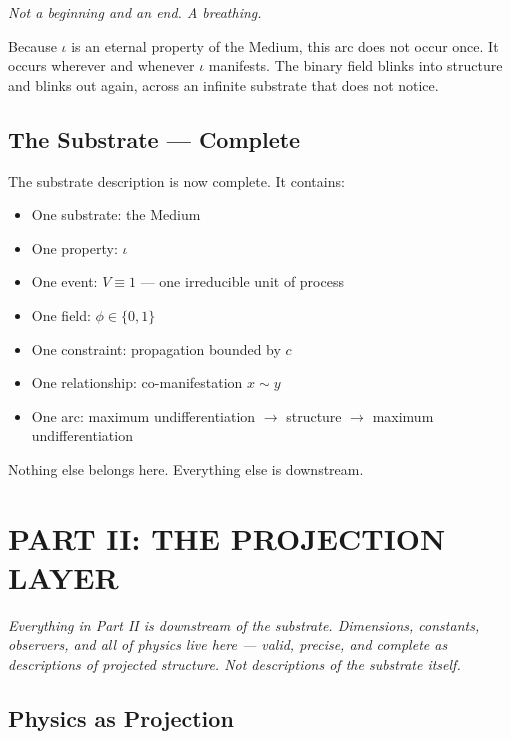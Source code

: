 \documentclass[12pt, letterpaper]{article}
\begin{document}
\begin{center}
\emph{Not a beginning and an end. A breathing.}
\end{center}

Because \(\iota\) is an eternal property of the Medium, this arc does not occur
once. It occurs wherever and whenever \(\iota\) manifests. The binary field
blinks into structure and blinks out again, across an infinite substrate that
does not notice.
\subsection{The Substrate --- Complete}
\label{sec:org5f22ec6}

The substrate description is now complete. It contains:

\begin{substratebox}
\begin{itemize}
\item One substrate: the Medium
\item One property: $\iota$
\item One event: $V \equiv 1$ --- one irreducible unit of process
\item One field: $\phi \in \{0,1\}$
\item One constraint: propagation bounded by $c$
\item One relationship: co-manifestation $x \sim y$
\item One arc: maximum undifferentiation $\to$ structure $\to$ maximum undifferentiation
\end{itemize}
\vspace{0.5em}
\noindent Nothing else belongs here. Everything else is downstream.
\end{substratebox}

\newpage
\section{PART II: THE PROJECTION LAYER}
\label{sec:org4507b1f}

\noindent\textit{Everything in Part II is downstream of the substrate. Dimensions, constants, observers, and all of physics live here --- valid, precise, and complete as descriptions of projected structure. Not descriptions of the substrate itself.}
\vspace{1em}
\subsection{Physics as Projection}
\label{sec:org9dfbd7f}
\end{document}
